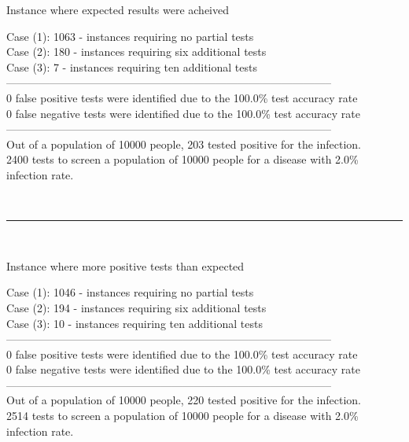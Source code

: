 \documentclass[letterpaper, 10pt,DIV=13]{scrartcl}
\numberwithin{equation}{section} %
\numberwithin{figure}{section} %
\numberwithin{table}{section} %
\begin{document}
\begin{displayquote}
\begin{center}
    Instance where expected results were acheived 
\end{center}
Case (1): 1063 - instances requiring no partial tests\\
Case (2): 180 - instances requiring six additional tests\\
Case (3): 7 - instances requiring ten additional tests\\
-----------------------------------------------------------------------------------------\\
0 false positive tests were identified due to the 100.0\% test accuracy rate\\
0 false negative tests were identified due to the 100.0\% test accuracy rate\\
-----------------------------------------------------------------------------------------\\
Out of a population of 10000 people, 203 tested positive for the infection.\\
2400 tests to screen a population of 10000 people for a disease with 2.0\% infection rate.\\
\end{displayquote}
\\
\begin{center}
\rule{12cm}{.4pt}
\end{center}
\\
\begin{displayquote}
\begin{center}
    Instance where more positive tests than expected
\end{center}
Case (1): 1046 - instances requiring no partial tests\\
Case (2): 194 - instances requiring six additional tests\\
Case (3): 10 - instances requiring ten additional tests\\
-----------------------------------------------------------------------------------------\\
0 false positive tests were identified due to the 100.0\% test accuracy rate\\
0 false negative tests were identified due to the 100.0\% test accuracy rate\\
-----------------------------------------------------------------------------------------\\
Out of a population of 10000 people, 220 tested positive for the infection.\\
2514 tests to screen a population of 10000 people for a disease with 2.0\% infection rate.
\end{displayquote}
\end{document}
